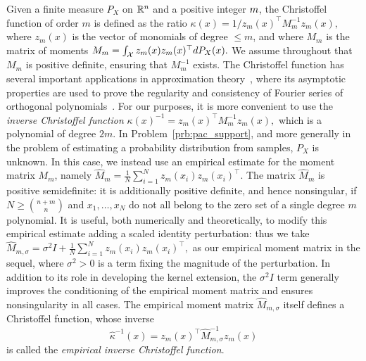 \documentclass[onefignum,onetabnum]{siamart171218}
\begin{document}
Given a finite measure $P_X$ on $\mathbb{R}^n$ and a positive integer $m$,
the Christoffel function of order $m$ is defined as the ratio
$
    \kappa(x) = 1/z_m(x)^\top M_{m}^{-1}z_m(x),
$
where $z_m(x)$ is the vector of monomials of degree $\le m$, and
where $M_{m}$ is the matrix of moments
$
    M_m = \int_{\mathcal{X}} z_m(x) z_m(x)^\top dP_X(x).
$
We assume throughout that $M_m$ is positive definite, ensuring that $M_m^{-1}$
exists. 
The Christoffel function has several important applications in
approximation theory~\cite{nevai1986geza}, where its asymptotic properties are used to prove the
regularity and consistency of Fourier series of orthogonal
polynomials~\cite{xu1995christoffel}. 
For our
purposes, it is more convenient to use the \emph{inverse Christoffel function}
$
    {\kappa(x)}^{-1} = z_m(x)^\top M_{m}^{-1}z_m(x),
$
which is a polynomial of degree $2m$.
In Problem~\ref{prb:pac_support}, and more generally in the problem of estimating a
probability distribution from samples, $P_X$ is unknown. 
In this case, 
we instead use an empirical estimate for
the moment matrix $M_{m}$, namely
$
\hat{M}_m
=
\frac{1}{N}
\sum_{i=1}^N
z_m(x_i)
z_m(x_i)^\top
$.
The matrix $\hat{M}_m$ is positive semidefinite: it is additionally
positive definite, and hence nonsingular, if $N \ge \binom{n+m}{n}$ and
$x_1,\dotsc,x_N$ do not all belong to the zero set of a single degree $m$
polynomial. 
It is useful, both numerically and theoretically, to modify this empirical
estimate adding a scaled identity perturbation: thus we take
$
%
\hat{M}_{m,\sigma}
= 
\sigma^2 I 
+ 
\frac{1}{N}
\sum_{i=1}^N
z_m(x_i)
z_m(x_i)^\top,
$
as our empirical moment matrix in the sequel,
where $\sigma^2 > 0$ is a term fixing the magnitude of the
perturbation. 
In addition to its role in developing the kernel extension, 
the $\sigma^2I$ term generally improves the conditioning of the empirical moment
matrix and ensures nonsingularity in all cases.
The empirical moment matrix $\hat{M}_{m,\sigma}$ itself defines a Christoffel
function, whose inverse
\begin{equation}
    \label{eq:empirical_cfun_def}
    \hat{\kappa}^{-1}(x)=z_m(x)^\top 
        \hat{M}_{m,\sigma}^{-1}z_m(x)
\end{equation}
is called the \emph{empirical inverse Christoffel function}. 
\end{document}
